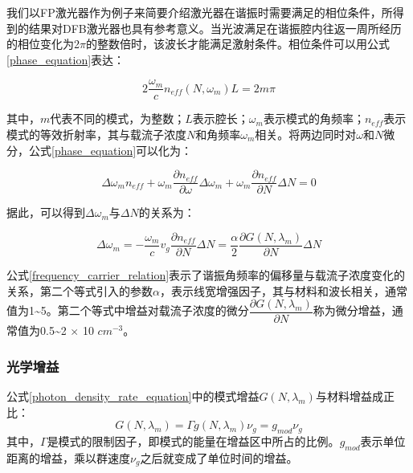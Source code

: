 我们以FP激光器作为例子来简要介绍激光器在谐振时需要满足的相位条件，所得到的结果对DFB激光器也具有参考意义。当光波满足在谐振腔内往返一周所经历的相位变化为2$\pi$的整数倍时，该波长才能满足激射条件。相位条件可以用公式\ref{phase_equation}表达：

\begin{equation}
\label{phase_equation}
2\dfrac{\omega_{m}}{c}n_{eff}(N,\omega_{m})L = 2m\pi
\end{equation}

其中，$m$代表不同的模式，为整数；$L$表示腔长；$\omega_{m}$表示模式的角频率；$n_{eff}$表示模式的等效折射率，其与载流子浓度$N$和角频率$\omega_{m}$相关。将两边同时对$\omega$和$N$微分，公式\ref{phase_equation}可以化为：

\begin{equation}
\label{phase_equation_diff}
\Delta\omega_{m} n_{eff} + \omega_{m} \dfrac{\partial n_{eff}}{\partial \omega} \Delta\omega_{m}+\omega_{m}\dfrac{\partial n_{eff}}{\partial N} \Delta N = 0
\end{equation}

据此，可以得到$\Delta\omega_{m}$与$\Delta N$的关系为：

\begin{equation}
\label{frequency_carrier_relation}
\Delta\omega_{m} = -\dfrac{\omega_{m}}{c}v_{g}\dfrac{\partial n_{eff}}{\partial N} \Delta N = \dfrac{\alpha}{2}\dfrac{\partial G(N,\lambda_{m})}{\partial N} \Delta N 
\end{equation}

公式\ref{frequency_carrier_relation}表示了谐振角频率的偏移量与载流子浓度变化的关系，第二个等式引入的参数$\alpha$，表示线宽增强因子，其与材料和波长相关，通常值为1\~{}5。第二个等式中增益对载流子浓度的微分$\dfrac{\partial G(N,\lambda_{m})}{\partial N}$称为微分增益，通常值为0.5\~{}2 $\times$ 10 $cm^{-3}$。

\subsubsection{光学增益}

公式\ref{photon_density_rate_equation}中的模式增益$G(N,\lambda_{m})$与材料增益成正比：
\begin{equation}
\label{modal_gain}
G(N,\lambda_{m}) = \Gamma g(N,\lambda_{m})\nu_g = g_{mod}\nu_g
\end{equation}
其中，$\Gamma$是模式的限制因子，即模式的能量在增益区中所占的比例。$g_{mod}$表示单位距离的增益，乘以群速度$\nu_g$之后就变成了单位时间的增益。


